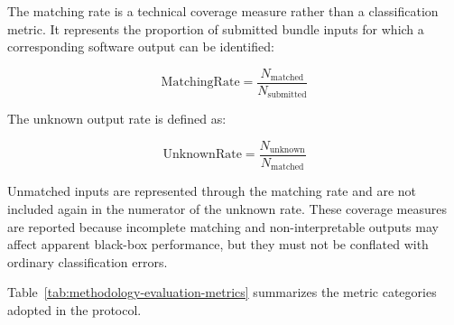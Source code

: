 The matching rate is a technical coverage measure rather than a classification
metric. It represents the proportion of submitted bundle inputs for which a
corresponding software output can be identified:

\begin{equation}
\mathrm{MatchingRate}
=
\frac{
N_{\mathrm{matched}}
}{
N_{\mathrm{submitted}}
}
\end{equation}

The unknown output rate is defined as:

\begin{equation}
\mathrm{UnknownRate}
=
\frac{
N_{\mathrm{unknown}}
}{
N_{\mathrm{matched}}
}
\end{equation}

Unmatched inputs are represented through the matching rate and are not included
again in the numerator of the unknown rate. These coverage measures are
reported because incomplete matching and non-interpretable outputs may affect
apparent black-box performance, but they must not be conflated with ordinary
classification errors.

Table~\ref{tab:methodology-evaluation-metrics} summarizes the metric categories
adopted in the protocol.

